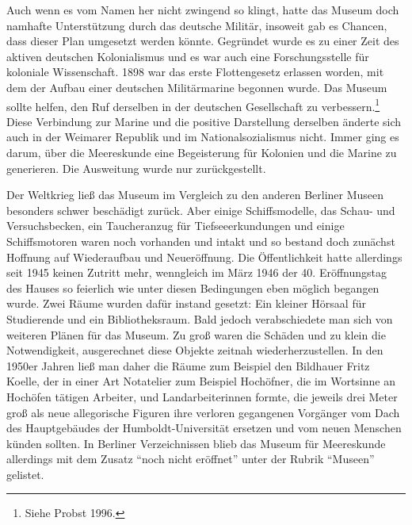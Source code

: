 \documentclass[a4paper,
fontsize=11pt,
oneside,
numbers=noperiodatend,
parskip=half-,
bibliography=totoc,
final
]{scrartcl}
\begin{document}
Auch wenn es vom Namen her nicht zwingend so klingt, hatte das Museum
doch namhafte Unterstützung durch das deutsche Militär, insoweit gab es
Chancen, dass dieser Plan umgesetzt werden könnte. Gegründet wurde es zu
einer Zeit des aktiven deutschen Kolonialismus und es war auch eine
Forschungsstelle für koloniale Wissenschaft. 1898 war das erste
Flottengesetz erlassen worden, mit dem der Aufbau einer deutschen
Militärmarine begonnen wurde. Das Museum sollte helfen, den Ruf
derselben in der deutschen Gesellschaft zu verbessern.\footnote{Siehe
  Probst 1996.} Diese Verbindung zur Marine und die positive Darstellung
derselben änderte sich auch in der Weimarer Republik und im
Nationalsozialismus nicht. Immer ging es darum, über die Meereskunde
eine Begeisterung für Kolonien und die Marine zu generieren. Die
Ausweitung wurde nur zurückgestellt.

Der Weltkrieg ließ das Museum im Vergleich zu den anderen Berliner
Museen besonders schwer beschädigt zurück. Aber einige Schiffsmodelle,
das Schau- und Versuchsbecken, ein Taucheranzug für Tiefseeerkundungen
und einige Schiffsmotoren waren noch vorhanden und intakt und so bestand
doch zunächst Hoffnung auf Wiederaufbau und Neueröffnung. Die
Öffentlichkeit hatte allerdings seit 1945 keinen Zutritt mehr,
wenngleich im März 1946 der 40. Eröffnungstag des Hauses so feierlich
wie unter diesen Bedingungen eben möglich begangen wurde. Zwei Räume
wurden dafür instand gesetzt: Ein kleiner Hörsaal für Studierende und
ein Bibliotheksraum. Bald jedoch verabschiedete man sich von weiteren
Plänen für das Museum. Zu groß waren die Schäden und zu klein die
Notwendigkeit, ausgerechnet diese Objekte zeitnah wiederherzustellen. In
den 1950er Jahren ließ man daher die Räume zum Beispiel den Bildhauer
Fritz Koelle, der in einer Art Notatelier zum Beispiel Hochöfner, die im
Wortsinne an Hochöfen tätigen Arbeiter, und Landarbeiterinnen formte,
die jeweils drei Meter groß als neue allegorische Figuren ihre verloren
gegangenen Vorgänger vom Dach des Hauptgebäudes der Humboldt-Universität
ersetzen und vom neuen Menschen künden sollten. In Berliner
Verzeichnissen blieb das Museum für Meereskunde allerdings mit dem
Zusatz \enquote{noch nicht eröffnet} unter der Rubrik \enquote{Museen}
gelistet.
\end{document}
